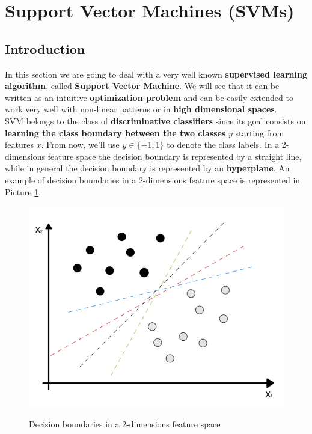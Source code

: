 \section{Support Vector Machines (SVMs)}
\subsection{Introduction}
In this section we are going to deal with a very well known \textbf{supervised learning algorithm}, called \textbf{Support Vector Machine}. We will see that it can be written as an intuitive \textbf{optimization problem} and can be easily extended to work very well with non-linear patterns or in \textbf{high dimensional spaces}.\\

SVM belongs to the class of \textbf{discriminative classifiers} since its goal consists on \textbf{learning the class boundary between the two classes} $y$ starting from features $x$. From now, we'll use $y\in\{-1,1\}$ to denote the class labels. In a 2-dimensions feature space the decision boundary is represented by a straight line, while in general the decision boundary is represented by an \textbf{hyperplane}. An example of decision boundaries in a 2-dimensions feature space is represented in Picture \ref{hyperplanes}.

\begin{figure}[h!]
		\centering
		\includegraphics[scale = 1.0]{img/hyperplanes.png}
		\label{hyperplanes}
		\caption{Decision boundaries in a 2-dimensions feature space}
\end{figure}


